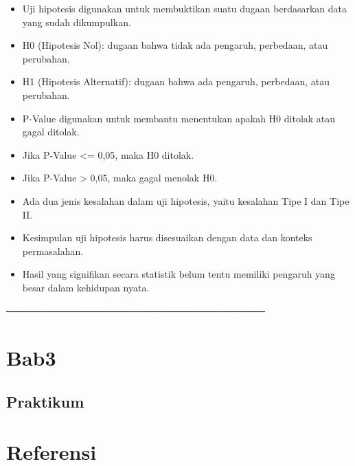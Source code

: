 \documentclass[
  indonesian,
  letterpaper,
]{book}
\providecommand{\tightlist}{%
  \setlength{\itemsep}{0pt}\setlength{\parskip}{0pt}}
\begin{document}
\begin{itemize}
\tightlist
\item
  Uji hipotesis digunakan untuk membuktikan suatu dugaan berdasarkan
  data yang sudah dikumpulkan.
\item
  H0 (Hipotesis Nol): dugaan bahwa tidak ada pengaruh, perbedaan, atau
  perubahan.
\item
  H1 (Hipotesis Alternatif): dugaan bahwa ada pengaruh, perbedaan, atau
  perubahan.
\item
  P-Value digunakan untuk membantu menentukan apakah H0 ditolak atau
  gagal ditolak.
\item
  Jika P-Value \textless= 0,05, maka H0 ditolak.
\item
  Jika P-Value \textgreater{} 0,05, maka gagal menolak H0.
\item
  Ada dua jenis kesalahan dalam uji hipotesis, yaitu kesalahan Tipe I
  dan Tipe II.
\item
  Kesimpulan uji hipotesis harus disesuaikan dengan data dan konteks
  permasalahan.
\item
  Hasil yang signifikan secara statistik belum tentu memiliki pengaruh
  yang besar dalam kehidupan nyata.
\end{itemize}

──────────────────────────────────────


\chapter{Bab3}\label{bab3}

\section{Praktikum}\label{praktikum}


\chapter*{Referensi}\label{referensi}


\protect{}\label{refs}


\backmatter
\end{document}
